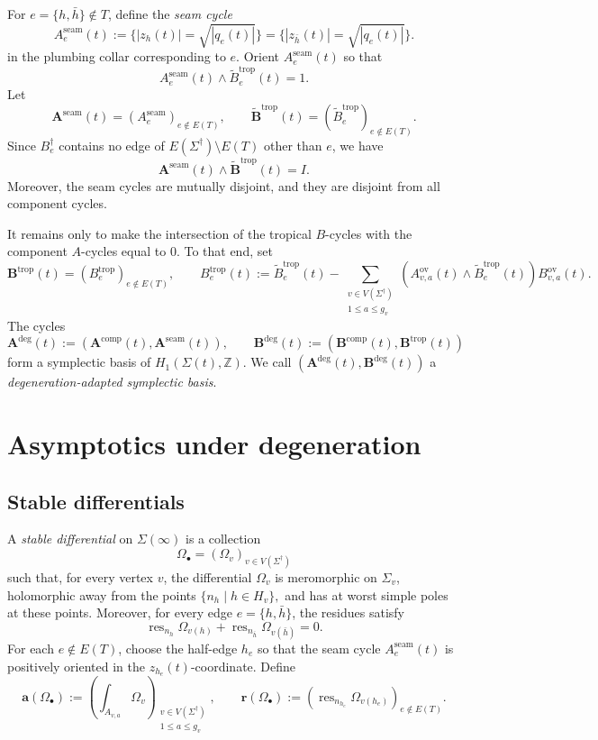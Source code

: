 \documentclass[12pt]{amsart}
\numberwithin{equation}{section}
\theoremstyle{definition}
\newcommand{\Z}{\mathbb{Z}}
\def\vertices{V}
\def\edges{E}
\def\res{\operatorname{res}}
\def\trop{\dagger}
\def\mcurve{\Sigma}
\def\tropmcurve{\mcurve^\trop}
\begin{document}
For $e=\{h,\bar h\}\notin T$, define the \emph{seam cycle}
\[
A_e^{\mathrm{seam}}(t)
:=
\{
|z_h(t)|
=
\sqrt{|q_e(t)|}
\} =\{|z_{\bar h}(t)|
=
\sqrt{|q_e(t)|} \}.
\]
in the plumbing collar corresponding to $e$. Orient $A_e^{\mathrm{seam}}(t)$ so that
\[
A_e^{\mathrm{seam}}(t)
\wedge
\widetilde B_e^{\mathrm{trop}}(t)
=
1.
\]
Let 
\[
\bm A^{\mathrm{seam}}(t) = (A_e^{\mathrm{seam}})_{e \notin \edges(T)}, \qquad \widetilde{\bm{B}}^{\mathrm{trop}}(t) = (\widetilde B_e^{\mathrm{trop}})_{e \notin \edges(T)}.
\]
Since $B_e^\trop$ contains no edge of
$\edges(\tropmcurve)\setminus\edges(T)$ other than $e$, we have
\[
\bm A^{\mathrm{seam}}(t) \wedge \widetilde{\bm{B}}^{\mathrm{trop}}(t) = I.
\]
Moreover, the seam cycles are mutually disjoint, and they are disjoint
from all component cycles.

It remains only to make the intersection of the tropical $B$-cycles with the
component $A$-cycles equal to $0$. To that end, set
\[
{\bm{B}}^{\mathrm{trop}}(t) = (B_e^{\mathrm{trop}})_{e \notin \edges(T)}, \qquad B_e^{\mathrm{trop}}(t)
:=
\widetilde B_e^{\mathrm{trop}}(t)
-
\sum_{\substack{v\in\vertices(\tropmcurve)\\1\leq a\leq g_v}}
(
A_{v,a}^{\mathrm{ov}}(t)
\wedge \widetilde B_e^{\mathrm{trop}}(t)
)
B_{v,a}^{\mathrm{ov}}(t).
\]
The cycles
\[
\bm A^{\mathrm{deg}}(t)
:=
(
\bm A^{\mathrm{comp}}(t),
\bm A^{\mathrm{seam}}(t)
),
\qquad
\bm B^{\mathrm{deg}}(t)
:=
(
\bm B^{\mathrm{comp}}(t),
\bm B^{\mathrm{trop}}(t)
)
\]
form a symplectic basis of
$
H_1(\mcurve(t),\Z).
$
We call
$
(
\bm A^{\mathrm{deg}}(t),
\bm B^{\mathrm{deg}}(t)
)
$
a \emph{degeneration-adapted symplectic basis}.



\section{Asymptotics under degeneration}\label{sec:asymptotics}


\subsection{Stable differentials}
\label{sec:stable_differentials}

A \emph{stable differential} on $\mcurve(\infty)$ is a collection
\[
\Omega_\bullet
=
(
\Omega_v
)_{v\in\vertices(\tropmcurve)}
\]
such that, for every vertex $v$, the differential $\Omega_v$ is
meromorphic on $\mcurve_v$, holomorphic away from the points
$
\{
n_h
\mid
h\in H_v
\},
$
and has at worst simple poles at these points. Moreover, for every edge
$e=\{h,\bar h\}$, the residues satisfy
\begin{equation}\label{eq:residue_matching}
\res_{n_h}\Omega_{v(h)}
+
\res_{n_{\bar h}}\Omega_{v(\bar h)}
=
0.
\end{equation}
For each $e\notin\edges(T)$, choose the half-edge
$h_e$ so that the seam cycle $A_e^{\mathrm{seam}}(t)$ is positively
oriented in the $z_{h_e}(t)$-coordinate. Define
\[
\bm a(\Omega_\bullet)
:=
\left(
\int_{A_{v,a}}\Omega_v
\right)_{
\substack{
v\in\vertices(\tropmcurve)\\
1\leq a\leq g_v
}},
\qquad
\bm r(\Omega_\bullet)
:=
\left(
\res_{n_{h_e}}\Omega_{v(h_e)}
\right)_{
e\notin\edges(T)
}.
\]
\end{document}
